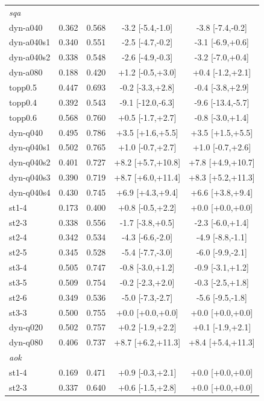 \begin{table}[t]
\begin{tabular}{lcccc}
\multicolumn{5}{l}{\textit{sqa}}\\
dyn-a040 & 0.362 & 0.568 & -3.2 [-5.4,-1.0] & -3.8 [-7.4,-0.2]\\
dyn-a040s1 & 0.340 & 0.551 & -2.5 [-4.7,-0.2] & -3.1 [-6.9,+0.6]\\
dyn-a040s2 & 0.338 & 0.548 & -2.6 [-4.9,-0.3] & -3.2 [-7.0,+0.4]\\
dyn-a080 & 0.188 & 0.420 & +1.2 [-0.5,+3.0] & +0.4 [-1.2,+2.1]\\
topp0.5 & 0.447 & 0.693 & -0.2 [-3.3,+2.8] & -0.4 [-3.8,+2.9]\\
topp0.4 & 0.392 & 0.543 & -9.1 [-12.0,-6.3] & -9.6 [-13.4,-5.7]\\
topp0.6 & 0.568 & 0.760 & +0.5 [-1.7,+2.7] & -0.8 [-3.0,+1.4]\\
dyn-q040 & 0.495 & 0.786 & +3.5 [+1.6,+5.5] & +3.5 [+1.5,+5.5]\\
dyn-q040s1 & 0.502 & 0.765 & +1.0 [-0.7,+2.7] & +1.0 [-0.7,+2.6]\\
dyn-q040s2 & 0.401 & 0.727 & +8.2 [+5.7,+10.8] & +7.8 [+4.9,+10.7]\\
dyn-q040s3 & 0.390 & 0.719 & +8.7 [+6.0,+11.4] & +8.3 [+5.2,+11.3]\\
dyn-q040s4 & 0.430 & 0.745 & +6.9 [+4.3,+9.4] & +6.6 [+3.8,+9.4]\\
st1-4 & 0.173 & 0.400 & +0.8 [-0.5,+2.2] & +0.0 [+0.0,+0.0]\\
st2-3 & 0.338 & 0.556 & -1.7 [-3.8,+0.5] & -2.3 [-6.0,+1.4]\\
st2-4 & 0.342 & 0.534 & -4.3 [-6.6,-2.0] & -4.9 [-8.8,-1.1]\\
st2-5 & 0.345 & 0.528 & -5.4 [-7.7,-3.0] & -6.0 [-9.9,-2.1]\\
st3-4 & 0.505 & 0.747 & -0.8 [-3.0,+1.2] & -0.9 [-3.1,+1.2]\\
st3-5 & 0.509 & 0.754 & -0.2 [-2.3,+2.0] & -0.3 [-2.5,+1.8]\\
st2-6 & 0.349 & 0.536 & -5.0 [-7.3,-2.7] & -5.6 [-9.5,-1.8]\\
st3-3 & 0.500 & 0.755 & +0.0 [+0.0,+0.0] & +0.0 [+0.0,+0.0]\\
dyn-q020 & 0.502 & 0.757 & +0.2 [-1.9,+2.2] & +0.1 [-1.9,+2.1]\\
dyn-q080 & 0.406 & 0.737 & +8.7 [+6.2,+11.3] & +8.4 [+5.4,+11.3]\\
\multicolumn{5}{l}{\textit{aok}}\\
st1-4 & 0.169 & 0.471 & +0.9 [-0.3,+2.1] & +0.0 [+0.0,+0.0]\\
st2-3 & 0.337 & 0.640 & +0.6 [-1.5,+2.8] & +0.0 [+0.0,+0.0]\\

\end{tabular}
\end{table}
